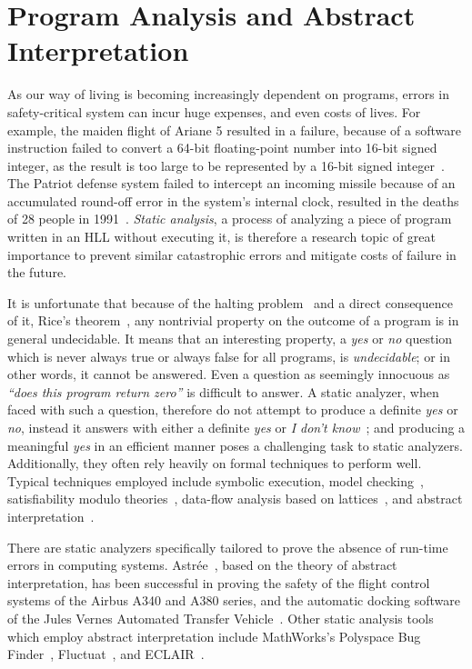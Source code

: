 \section{Program Analysis and Abstract Interpretation}
\label{bg:sec:abstract_interpretation}

As our way of living is becoming increasingly dependent on programs, errors
in safety-critical system can incur huge expenses, and even costs of lives.
For example, the maiden flight of Ariane 5 resulted in a failure, because of
a software instruction failed to convert a 64-bit floating-point number into
16-bit signed integer, as the result is too large to be represented by a 16-bit
signed integer~\cite{dowson97}.  The Patriot defense system failed to intercept
an incoming missile because of an accumulated round-off error in the system's
internal clock, resulted in the deaths of 28 people in 1991~\cite{patriot}.
\emph{Static analysis}, a process of analyzing a piece of program written in
an HLL without executing it, is therefore a research topic of great importance
to prevent similar catastrophic errors and mitigate costs of failure in the
future.

It is unfortunate that because of the halting problem~\cite{turing37} and
a direct consequence of it, Rice's theorem~\cite{rice53}, any nontrivial
property on the outcome of a program is in general undecidable.  It means that
an interesting property, a \emph{yes} or \emph{no} question which is never
always true or always false for all programs, is \emph{undecidable}; or in
other words, it cannot be answered.  Even a question as seemingly innocuous
as \emph{``does this program return zero''} is difficult to answer.  A static
analyzer, when faced with such a question, therefore do not attempt to
produce a definite \emph{yes} or \emph{no}, instead it answers with either
a definite \emph{yes} or \emph{I don't know}~\cite{mine04}; and producing a
meaningful \emph{yes} in an efficient manner poses a challenging task to static
analyzers.  Additionally, they often rely heavily on formal techniques to
perform well.  Typical techniques employed include symbolic execution, model
checking~\cite{kroening03}, satisfiability modulo theories~\cite{demoura08},
data-flow analysis based on lattices~\cite{nielson99}, and abstract
interpretation~\cite{cousot77}.

There are static analyzers specifically tailored to prove the absence of
run-time errors in computing systems.  Astr\'ee~\cite{astree}, based on
the theory of abstract interpretation, has been successful in proving the
safety of the flight control systems of the Airbus A340 and A380 series,
and the automatic docking software of the Jules Vernes Automated Transfer
Vehicle~\cite{dasia09}.  Other static analysis tools which employ abstract
interpretation include MathWorks's Polyspace Bug Finder~\cite{polyspace},
Fluctuat~\cite{Fluctuat}, and ECLAIR~\cite{eclair}.

